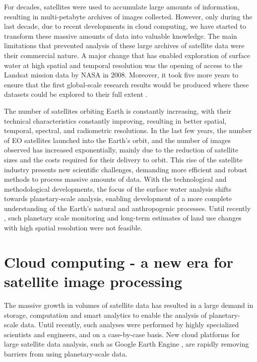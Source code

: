 For decades, satellites were used to accumulate large amounts of information, resulting in multi-petabyte archives of images collected. However, only during the last decade, due to recent developments in cloud computing, we have started to transform these massive amounts of data into valuable knowledge. The main limitations that prevented analysis of these large archives of satellite data were their commercial nature. A major change that has enabled exploration of surface water at high spatial and temporal resolution was the opening of access to the Landsat mission data by NASA in 2008. Moreover, it took five more years to ensure that the first global-scale research results would be produced where these datasets could be explored to their full extent \citet{Hansen2013}.


The number of satellites orbiting Earth is constantly increasing, with their technical characteristics constantly improving, resulting in better spatial, temporal, spectral, and radiometric resolutions. In the last few years, the number of \gls{EO} satellites launched into the Earth's orbit, and the number of images observed has increased exponentially, mainly due to the reduction of satellite sizes and the costs required for their delivery to orbit. This rise of the satellite industry presents new scientific challenges, demanding more efficient and robust methods to process massive amounts of data. With the technological and methodological developments, the focus of the surface water analysis shifts towards planetary-scale analysis, enabling development of a more complete understanding of the Earth's natural and anthropogenic processes. Until recently \citet{Hansen2013, pekel2016high}, such planetary scale monitoring and long-term estimates of land use changes with high spatial resolution were not feasible.

\section{Cloud computing - a new era for satellite image processing}

The massive growth in volumes of satellite data has resulted in a large demand in storage, computation and smart analytics to enable the analysis of planetary-scale data. Until recently, such analyses were performed by highly specialized scientists and engineers, and on a case-by-case basis. New cloud platforms for large satellite data analysis, such as Google Earth Engine \citet{Gorelick2012}, are rapidly removing barriers from using planetary-scale data. 

